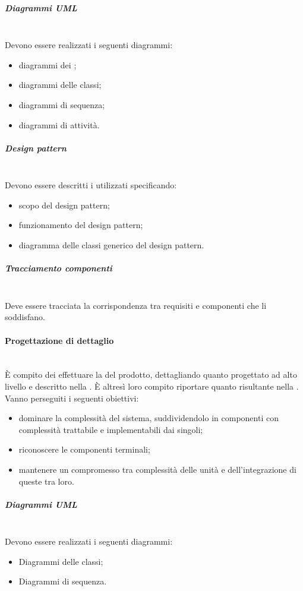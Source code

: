 \subparagraph{Diagrammi UML}\mbox{}\\
Devono essere realizzati i seguenti diagrammi:
\begin{itemize}
	\item diagrammi dei ;
	\item diagrammi delle classi;
	\item diagrammi di sequenza;
	\item diagrammi di attività.
\end{itemize}

\subparagraph{Design pattern}\mbox{}\\
Devono essere descritti i  utilizzati specificando:
\begin{itemize}
	\item scopo del design pattern;
	\item funzionamento del design pattern;
	\item diagramma delle classi generico del design pattern.
\end{itemize}

\subparagraph{Tracciamento componenti}\mbox{}\\
Deve essere tracciata la corrispondenza tra requisiti e componenti che li soddisfano.

\paragraph{Progettazione di dettaglio}\mbox{}\\
\`{E} compito dei \Progettisti{} effettuare la \PD{} del prodotto, dettagliando quanto progettato ad alto livello e descritto nella \SpecificaTecnica{}. È altresì loro compito riportare quanto risultante nella \DefinizioneDiProdotto{}.\\
Vanno perseguiti i seguenti obiettivi:
\begin{itemize}
	\item dominare la complessità del sistema, suddividendolo in componenti con complessità trattabile e implementabili dai singoli;
	\item riconoscere le componenti terminali;
	\item mantenere un compromesso tra complessità delle unità e dell'integrazione di queste tra loro.
\end{itemize}

\subparagraph{Diagrammi UML}\mbox{}\\
Devono essere realizzati i seguenti diagrammi:
\begin{itemize}
	\item Diagrammi delle classi;
	\item Diagrammi di sequenza.
\end{itemize}

